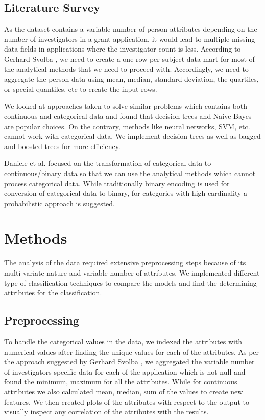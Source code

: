 \documentclass{article} %
\begin{document}
	
	\subsection{Literature Survey}
	
	As the dataset contains a variable number of person attributes depending on the number of investigators in a grant application, it would lead to multiple missing data fields in applications where the investigator count is less. According to Gerhard Svolba \cite{OneRow}, we need to create a one-row-per-subject data mart for most of the analytical methods that we need to proceed with. Accordingly, we need to aggregate the person data using mean, median, standard deviation, the quartiles, or special quantiles, etc to create the input rows.
	
	We looked at approaches taken to solve similar problems which contains both continuous and categorical data \cite{Matlab} and found that decision trees and Naive Bayes are popular choices. On the contrary, methods like neural networks, SVM, etc. cannot work with categorical data. We implement decision trees as well as bagged and boosted trees for more efficiency. 
	
	Daniele et al. \cite{HighCard} focused on the transformation of categorical data to continuous/binary data so that we can use the analytical methods which cannot process categorical data. While traditionally binary encoding is used for conversion of categorical data to binary, for categories with high cardinality a probabilistic approach is suggested.
	
	\section{Methods}
	
	The analysis of the data required extensive preprocessing steps because of its multi-variate nature and variable number of attributes. We implemented different type of classification techniques to compare the models and find the determining attributes for the classification.
	
	\subsection{Preprocessing}
	
	To handle the categorical values in the data, we indexed the attributes with numerical values after finding the unique values for each of the attributes. As per the approach suggested by Gerhard Svolba \cite{OneRow}, we aggregated the variable number of investigators specific data for each of the application which is not null and found the minimum, maximum for all the attributes. While for continuous attributes we also calculated mean, median, sum of the values to create new features. We then created plots of the attributes with respect to the output to visually inspect any correlation of the attributes with the results.
	
\end{document}
